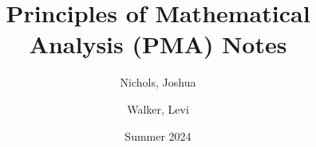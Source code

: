 \documentclass[12pt]{article}
\author{
    Nichols, Joshua\\
    \and
    Walker, Levi
}
\date{Summer 2024}
\title{Principles of Mathematical Analysis (PMA) Notes}
\begin{document}
\maketitle

\tableofcontents

\pagebreak

\end{document}
